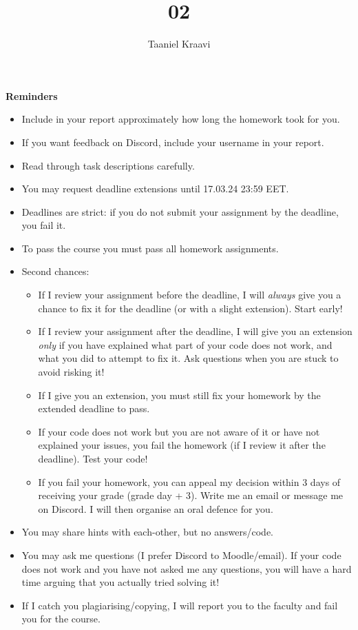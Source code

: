 \documentclass{homework}
\title{02}
\author{Taaniel Kraavi}
\date{\DTMdate{2024-03-21}}
\begin{document}
\maketitle

\textbf{Reminders}

\begin{itemize}
  \item Include in your report approximately how long the homework took for you.
  \item If you want feedback on Discord, include your username in your report.
  \item Read through task descriptions carefully.
  \item You may request deadline extensions until 17.03.24 23:59 EET.
  \item Deadlines are strict: if you do not submit your assignment by the deadline, you fail it.
  \item To pass the course you must pass all homework assignments.
  \item Second chances:
  \begin{itemize}
    \item If I review your assignment before the deadline, I will \emph{always} give you a chance to fix it for the deadline (or with a slight extension).
    Start early!
    \item If I review your assignment after the deadline, I will give you an extension \emph{only} if you have explained what part of your code does not work, and what you did to attempt to fix it.
    Ask questions when you are stuck to avoid risking it!
    \item If I give you an extension, you must still fix your homework by the extended deadline to pass.
    \item If your code does not work but you are not aware of it or have not explained your issues, you fail the homework (if I review it after the deadline).
    Test your code!
    \item If you fail your homework, you can appeal my decision within 3 days of receiving your grade (grade day + 3).
    Write me an email or message me on Discord.
    I will then organise an oral defence for you.
  \end{itemize}
  \item You may share hints with each-other, but no answers/code.
  \item You may ask me questions (I prefer Discord to Moodle/email).
  If your code does not work and you have not asked me any questions, you will have a hard time arguing that you actually tried solving it!
  \item If I catch you plagiarising/copying, I will report you to the faculty and fail you for the course.
\end{itemize}
\end{document}
